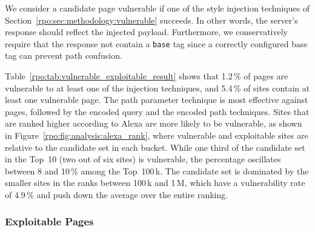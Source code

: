 

We consider a candidate page vulnerable if one of the style injection techniques
of Section~\ref{rpo:sec:methodology:vulnerable} succeeds. In other
words, the server's response should reflect the injected payload. Furthermore,
we conservatively require that the response not contain a \texttt{base} tag
since a correctly configured base tag can prevent path confusion.

Table~\ref{rpo:tab:vulnerable_exploitable_result} shows that 1.2\,\% of pages
are vulnerable to at least one of the injection techniques, and 5.4\,\% of sites
contain at least one vulnerable page. The path parameter technique is most
effective against pages, followed by the encoded query and the encoded path
techniques. Sites that are ranked higher according to Alexa are more likely to
be vulnerable, as shown in Figure~\ref{rpo:fig:analysis:alexa_rank}, where
vulnerable and exploitable sites are relative to the candidate set in each
bucket. While one third of the candidate set in the Top~10 (two out of six
sites) is vulnerable, the percentage oscillates between 8 and 10\,\% among the
Top~100\,k. The candidate set is dominated by the smaller sites in the ranks
between 100\,k and 1\,M, which have a vulnerability rate of 4.9\,\% and push
down the average over the entire ranking.



\subsubsection{Exploitable Pages}
\label{rpo:sec:analysis:exploitable}

